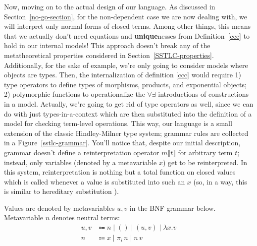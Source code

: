 Now, moving on to the actual design of our language. As
discussed in Section~\ref{no-go-section}, for the
non-dependent case we are now dealing with, we will
interpret only normal forms of closed terms. Among other
things, this means that we actually don't need equations
and \textbf{unique}nesses from Definition~\ref{ccc} to
hold in our internal models! This approach doesn't break
any of the metatheoretical properties considered in
Section~\ref{SSTLC-properties}. Additionally, for the
sake of example, we're only going to consider models
where objects are types. Then, the internalization of
definition \ref{ccc} would require 1) type operators to
define types of morphisms, products, and exponential
objects; 2) polymorphic functions to operationalize the
$\forall\exists$ introductions of constructions in a
model. Actually, we're going to get rid of type
operators as well, since we can do with just
types-in-a-context which are then substituted into
the definition of a model for checking term-level
operations. This way, our language is a small extension
of the classic Hindley-Milner type system; grammar rules
are collected in a Figure~\ref{sstlc-grammar}. You'll
notice that, despite our initial description, grammar
doesn't define a reinterpretation operator
$m\llbracket t\rrbracket$ for arbitrary term $t$;
instead, only variables (denoted by a metavariable $x$)
get to be reinterpreted. In this system,
reinterpretation is nothing but a total function on
closed values which is called whenever a value is
substituted into such an $x$ (so, in a way, this is
similar to hereditary substitution
\cite{watkins2003concurrent,keller2010hereditary}).

\begin{definition}
Values are denoted by metavariables $u,v$ in the BNF
grammar below. Metavariable $n$ denotes neutral terms:
\begin{align*}
    u,v&\Coloneqq n\;|\;()\;|\;(u,v)\;|\;\lambda x.v\\
    n&\Coloneqq x\;|\;\pi_i\,n\;|\;n\,v
\end{align*}
\end{definition}

